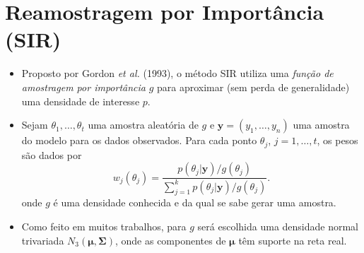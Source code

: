 \documentclass[9pt]{beamer}
\begin{document}
\section{Reamostragem por Importância (SIR)}
\begin{frame}
\begin{itemize}
\justifying	
\item Proposto por Gordon \textit{et al.} (1993), o método SIR utiliza uma \textit{função de amostragem por importância} $g$ para aproximar (sem perda de generalidade) uma densidade de interesse $p$.

\item Sejam $\theta_1, \ldots, \theta_t$ uma amostra aleatória de $g$ e $\bm{y} = (y_1, \ldots, y_n)$ uma amostra do modelo para os dados observados. Para cada ponto $\theta_j$, $j = 1, \ldots, t$, os pesos são dados por
\begin{equation}\label{eq:sir_wei}
w_j(\theta_j) = \dfrac{p(\theta_j | \bm{y}) / g(\theta_j)}{\sum_{j=1}^{k} p(\theta_j | \bm{y}) / g(\theta_j)}.
\end{equation}
onde $g$ é uma densidade conhecida e da qual se sabe gerar uma amostra. 
\item Como feito em muitos trabalhos, para $g$ será escolhida uma densidade normal trivariada $N_3(\bm{\mu}, \bm{\Sigma})$, onde as componentes de $\bm{\mu}$ têm suporte na reta real.
\end{itemize}
\end{frame}
\end{document}
